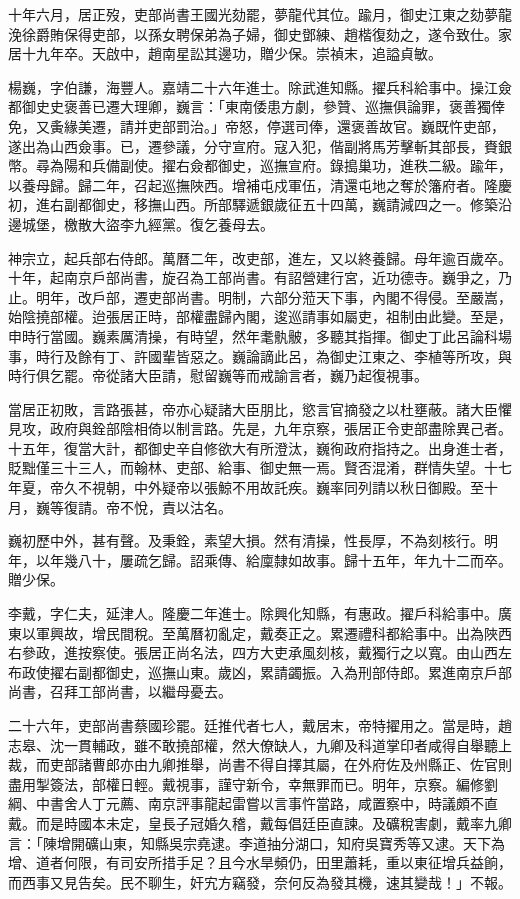 \begin{pinyinscope}
十年六月，居正歿，吏部尚書王國光劾罷，夢龍代其位。踰月，御史江東之劾夢龍浼徐爵賄保得吏部，以孫女聘保弟為子婦，御史鄧練、趙楷復劾之，遂令致仕。家居十九年卒。天啟中，趙南星訟其邊功，贈少保。崇禎末，追謚貞敏。

楊巍，字伯謙，海豐人。嘉靖二十六年進士。除武進知縣。擢兵科給事中。操江僉都御史史褒善已遷大理卿，巍言：「東南倭患方劇，參贊、巡撫俱論罪，褒善獨倖免，又夤緣美遷，請并吏部罰治。」帝怒，停選司俸，還褒善故官。巍既忤吏部，遂出為山西僉事。已，遷參議，分守宣府。寇入犯，偕副將馬芳擊斬其部長，賚銀幣。尋為陽和兵備副使。擢右僉都御史，巡撫宣府。錄搗巢功，進秩二級。踰年，以養母歸。歸二年，召起巡撫陜西。增補屯戍軍伍，清還屯地之奪於籓府者。隆慶初，進右副都御史，移撫山西。所部驛遞銀歲征五十四萬，巍請減四之一。修築沿邊城堡，檄散大盜李九經黨。復乞養母去。

神宗立，起兵部右侍郎。萬曆二年，改吏部，進左，又以終養歸。母年逾百歲卒。十年，起南京戶部尚書，旋召為工部尚書。有詔營建行宮，近功德寺。巍爭之，乃止。明年，改戶部，遷吏部尚書。明制，六部分蒞天下事，內閣不得侵。至嚴嵩，始陰撓部權。迨張居正時，部權盡歸內閣，逡巡請事如屬吏，祖制由此變。至是，申時行當國。巍素厲清操，有時望，然年耄骫骳，多聽其指揮。御史丁此呂論科場事，時行及餘有丁、許國輩皆惡之。巍論謫此呂，為御史江東之、李植等所攻，與時行俱乞罷。帝從諸大臣請，慰留巍等而戒諭言者，巍乃起復視事。

當居正初敗，言路張甚，帝亦心疑諸大臣朋比，慾言官摘發之以杜壅蔽。諸大臣懼見攻，政府與銓部陰相倚以制言路。先是，九年京察，張居正令吏部盡除異己者。十五年，復當大計，都御史辛自修欲大有所澄汰，巍徇政府指持之。出身進士者，貶黜僅三十三人，而翰林、吏部、給事、御史無一焉。賢否混淆，群情失望。十七年夏，帝久不視朝，中外疑帝以張鯨不用故託疾。巍率同列請以秋日御殿。至十月，巍等復請。帝不悅，責以沽名。

巍初歷中外，甚有聲。及秉銓，素望大損。然有清操，性長厚，不為刻核行。明年，以年幾八十，屢疏乞歸。詔乘傳、給廩隸如故事。歸十五年，年九十二而卒。贈少保。

李戴，字仁夫，延津人。隆慶二年進士。除興化知縣，有惠政。擢戶科給事中。廣東以軍興故，增民間稅。至萬曆初亂定，戴奏正之。累遷禮科都給事中。出為陜西右參政，進按察使。張居正尚名法，四方大吏承風刻核，戴獨行之以寬。由山西左布政使擢右副都御史，巡撫山東。歲凶，累請蠲振。入為刑部侍郎。累進南京戶部尚書，召拜工部尚書，以繼母憂去。

二十六年，吏部尚書蔡國珍罷。廷推代者七人，戴居末，帝特擢用之。當是時，趙志皋、沈一貫輔政，雖不敢撓部權，然大僚缺人，九卿及科道掌印者咸得自舉聽上裁，而吏部諸曹郎亦由九卿推舉，尚書不得自擇其屬，在外府佐及州縣正、佐官則盡用掣簽法，部權日輕。戴視事，謹守新令，幸無罪而已。明年，京察。編修劉綱、中書舍人丁元薦、南京評事龍起雷嘗以言事忤當路，咸置察中，時議頗不直戴。而是時國本未定，皇長子冠婚久稽，戴每倡廷臣直諫。及礦稅害劇，戴率九卿言：「陳增開礦山東，知縣吳宗堯逮。李道抽分湖口，知府吳寶秀等又逮。天下為增、道者何限，有司安所措手足？且今水旱頻仍，田里蕭耗，重以東征增兵益餉，而西事又見告矣。民不聊生，奸宄方竊發，奈何反為發其機，速其變哉！」不報。


\end{pinyinscope}
